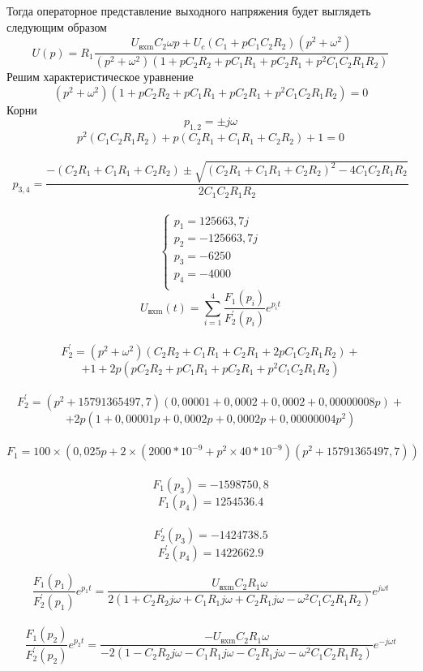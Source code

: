 \documentclass[12pt, a4paper]{report}
\begin{document}
    \newpage

    Тогда операторное представление выходного напряжения будет выглядеть следующим образом
    \[ U(p) = R_{1}\frac{U_\text{вxm}C_{2}\omega p + U_{c}(C_1 + pC_{1}C_{2}R_2)(p^2 + \omega^2)} {{(p^2 + \omega^2)(1 + pC_{2}R_{2} + pC_{1}R_{1} + pC_{2}R_{1} + p^2C_{1}C_{2}R_{1}R_{2})}} \]
    Решим характеристическое уравнение
    \[ (p^2 + \omega^2)(1 + pC_{2}R_{2} + pC_{1}R_{1} + pC_{2}R_{1} + p^2C_{1}C_{2}R_{1}R_{2}) = 0 \]
    Корни
    \[ p_{1,2} = \pm j\omega \]
    \[ p^2(C_{1}C_{2}R_{1}R_{2}) + p(C_{2}R_1 + C_{1}R_1 + C_{2}R_2) + 1 = 0 \]\\
    \[ p_{3,4} = \frac{-(C_{2}R_1 + C_{1}R_1 + C_{2}R_2) \pm \sqrt{(C_{2}R_1 + C_{1}R_1 + C_{2}R_2)^2 - 4C_{1}C_{2}R_{1}R_{2}}} {2C_{1}C_{2}R_{1}R_{2}} \]\\
    \begin{equation*}
        \begin{cases}
            p_1 = 125663,7j\\
            p_2 = - 125663,7j\\
            p_3 = - 6250\\
            p_4 = - 4000\\
        \end{cases}
    \end{equation*}
    \[ U_\text{вxm}(t) = \sum_{i = 1}^{4}\frac{F_{1}(p_i)} {F_{2}^\prime (p_i)}e^{p_{i}t} \]\\
    \[ F_{2}^\prime = (p^2 + \omega^2)(C_{2}R_{2} + C_{1}R_{1} + C_{2}R_{1} + 2pC_{1}C_{2}R_{1}R_{2}) + \]
    \[ + {1 + 2p(pC_{2}R_{2} + pC_{1}R_{1} + pC_{2}R_{1} + p^2C_{1}C_{2}R_{1}R_{2})} \]\\
    \[ F_{2}^\prime = (p^2 + 15791365497,7)( 0,00001 + 0,0002 + 0,0002 + 0,00000008p) +\]
    \[ + 2p(1 + 0,00001p + 0,0002p + 0,0002p + 0,00000004p^2)\]\\
    \[ F_1 = 100 \times (0,025p + 2 \times (2000 * 10^{-9} + p^2 \times 40 * 10^{-9}) (p^2 + 15791365497,7)) \]\\
    \[ F_{1}(p_3) = - 1598750,8 \]
    \[ F_{1}(p_4) = 1254536.4 \]\\
    \[ F_{2}^{\prime}(p_3) = - 1424738.5\]
    \[ F_{2}^{\prime}(p_4) = 1422662.9 \]

    \newpage

    \[ \frac{F_{1}(p_1)} {F_{2}^\prime (p_1)}e^{p_{1}t} = \frac{U_\text{вxm}C_{2}R_1\omega} {2(1 + C_{2}R_{2}j\omega + C_{1}R_{1}j\omega + C_{2}R_{1}j\omega - \omega^2C_{1}C_{2}R_{1}R_{2})}e^{j\omega t} \]\\
    \[ \frac{F_{1}(p_2)} {F_{2}^\prime (p_2)}e^{p_{2}t} = \frac{-U_\text{вxm}C_{2}R_1\omega} {-2(1 - C_{2}R_{2}j\omega - C_{1}R_{1}j\omega - C_{2}R_{1}j\omega - \omega^2C_{1}C_{2}R_{1}R_{2})}e^{-j\omega t} \]\\
\end{document}

